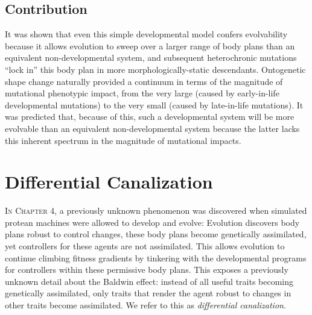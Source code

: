 \subsection{Contribution}


It was shown that even this simple developmental model confers evolvability 
because it allows evolution to sweep over a larger range of body plans than an equivalent non-developmental system, and subsequent heterochronic mutations
``lock in'' this body plan in more morphologically-static descendants.
Ontogenetic shape change
naturally provided
a continuum in terms of the magnitude of mutational phenotypic impact,
from the very large (caused by early-in-life developmental mutations) 
to the very small (caused by late-in-life mutations). 
It was predicted that,
because of this, such a developmental system will be more evolvable than an equivalent non-developmental system because the latter lacks this inherent spectrum in the magnitude of mutational impacts.



\section{Differential Canalization}

\textsc{In Chapter 4,}
a previously unknown phenomenon was discovered when simulated protean machines were allowed to develop and evolve: 
Evolution discovers body plans robust to control changes, these body plans become genetically assimilated, yet controllers for these agents are not assimilated. 
This allows evolution to continue climbing fitness gradients by tinkering with the developmental programs for controllers within these permissive body plans. 
This exposes a previously unknown detail about the Baldwin effect: instead of all useful traits becoming genetically assimilated, only traits that render the agent robust to changes in other traits become assimilated. 
We refer to this as \textit{differential canalization}.


